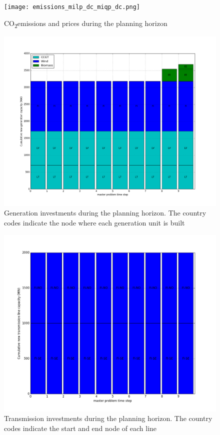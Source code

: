 \documentclass[final]{IEEEtran}
\newcommand{\COtwo}{CO\textsubscript{2}\;}
\begin{document}
\begin{figure}[htpb]
  \centering
  \texttt{[image: emissions\_milp\_dc\_miqp\_dc.png]}
  \caption{\COtwo emissions and prices during the planning horizon}
  \label{fig_emissions}
\end{figure}

\begin{figure}[htpb]
	\centering
	\includegraphics[width=\linewidth]{generation_investment_milp_dc_miqp_dc.png}
	\caption{Generation investments during the planning horizon. The country codes indicate the node where each generation unit is built}
	\label{fig_generation_investment}
\end{figure}

\begin{figure}[htpb]
	\centering
	\includegraphics[width=\linewidth]{transmission_investment_milp_dc_miqp_dc.png}
	\caption{Transmission investments during the planning horizon. The country codes indicate the start and end node of each line}
	\label{fig_transmission_investment}
\end{figure}
\end{document}
